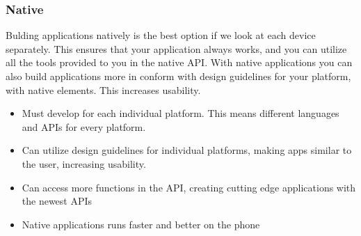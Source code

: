 \subsubsection{Native}
	Bulding applications natively is the best option if we look at each device
	separately. This ensures that your application always works, and you can
	utilize all the tools provided to you in the native API. With native
	applications you can also build applications more in conform with design
	guidelines for your platform, with native elements. This increases
	usability.

	\begin{itemize}
		\item Must develop for each individual platform. This means different
		languages and APIs for every platform.
		\item Can utilize design guidelines for individual platforms, making
		apps similar to the user, increasing usability.
		\item Can access more functions in the API, creating cutting edge
		applications with the newest APIs
		\item Native applications runs faster and better on the phone
	\end{itemize}
